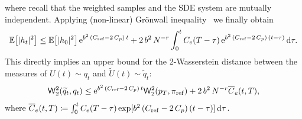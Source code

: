 \documentclass{article}
\begin{document}
%
where recall that the weighted samples and the SDE system are mutually independent.
Applying (non-linear) Gr\"{o}nwall inequality~\citep[][Theorem 21]{Dragomir2003} we finally obtain
%
\begin{equation}
	\operatorname{\mathbb{E}} \bigl[ \lvert h_t\rvert^2 \bigr] \leq \operatorname{\mathbb{E}} \bigl[ \lvert h_0\rvert^2 \bigr] \, \mathrm{e}^{b^2 \, (C_{\mathrm{ref}}-2 \, C_p) \, t} + 2 \, b^2 \, N^{-r} \int^t_0 C_e(T -\tau) \, \mathrm{e}^{b^2 \, (C_{\mathrm{ref}}-2 \, C_p) \, (t - \tau)} \mathop{}\!\mathrm{d} \tau.
\end{equation}
%
This directly implies an upper bound for the 2-Wasserstein distance between the measures of $U(t) \sim q_t$ and $\widetilde{U}(t) \sim \widetilde{q}_t$:
%
\begin{equation}
	\mathsf{W}_2^2(\widetilde{q}_t, q_t) \leq \mathrm{e}^{b^2 \,(C_{\mathrm{ref}} - 2\, C_p) \, t} \mathsf{W}_2^2(p_T, \pi_{\mathrm{ref}}) + 2 \, b^2 \, N^{-r} \overline{C}_e(t, T),
	\label{equ:appendix-bound}
\end{equation}
%
where $\overline{C}_e(t, T) \coloneqq \int^t_0 C_e(T -\tau) \exp[b^2 \, (C_{\mathrm{ref}}-2 \, C_p) \, (t - \tau)] \mathop{}\!\mathrm{d} \tau$.
\end{document}

